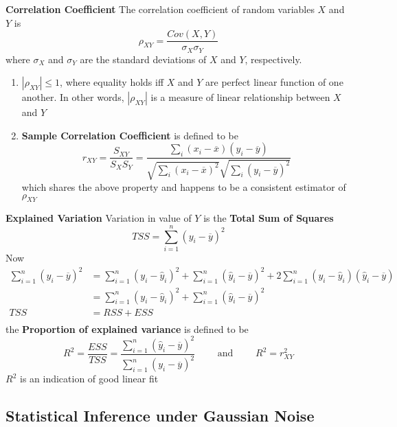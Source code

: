 \documentclass[11pt]{article}
\begin{document}
\begin{defn*}
  \textbf{Correlation Coefficient} The correlation coefficient of random variables $X$ and $Y$ is
  \[
    \rho_{XY} = \frac{Cov(X, Y)}{\sigma_X \sigma_Y}
  \]
  where $\sigma_X$ and $\sigma_Y$ are the standard deviations of $X$ and $Y$, respectively.
  \begin{enumerate}
    \item $|\rho_{XY}| \leq 1$, where equality holds iff $X$ and $Y$ are perfect linear function of one another. In other words, $|\rho_{XY}|$ is a measure of linear relationship between $X$ and $Y$
    \item \textbf{Sample Correlation Coefficient} is defined to be
    \[
      r_{XY} = \frac{S_{XY}}{S_X S_Y} = \frac{\sum_i (x_i - \overline{x}) (y_i - \overline{y}) }{ \sqrt{ \sum_i (x_i - \overline{x})^2  }  \sqrt{ \sum_i (y_i - \overline{y})^2  } }
    \]
    which shares the above property and happens to be a consistent estimator of $\rho_{XY}$
  \end{enumerate}
\end{defn*}

\begin{defn*}
  \textbf{Explained Variation} Variation in value of $Y$ is the \textbf{Total Sum of Squares}
  \[
    TSS = \sum_{i=1}^n (y_i - \overline{y})^2
  \]
  Now
  \begin{align*}
    \sum_{i=1}^n (y_i - \overline{y})^2 &= \sum_{i=1}^n (y_i - \hat{y}_i)^2 + \sum_{i=1}^n (\hat{y}_i - \overline{y})^2 + 2\sum_{i=1}^n (y_i - \hat{y}_i)(\hat{y}_i - \overline{y}) \\
    &= \sum_{i=1}^n (y_i - \hat{y}_i)^2 + \sum_{i=1}^n (\hat{y}_i - \overline{y})^2 \tag{by Normal Equation}\\
    TSS &= RSS + ESS\\
  \end{align*}
  the \textbf{Proportion of explained variance} is defined to be
  \[
    R^2 = \frac{ESS}{TSS} = \frac{ \sum_{i=1}^n (\hat{y}_i - \overline{y})^2 }{ \sum_{i=1}^n (y_i - \overline{y})^2} \quad \quad \text{ and }  \quad\quad  R^2 = r_{XY}^2
  \]
  $R^2$ is an indication of good linear fit
\end{defn*}


\subsection*{Statistical Inference under Gaussian Noise}
\end{document}
